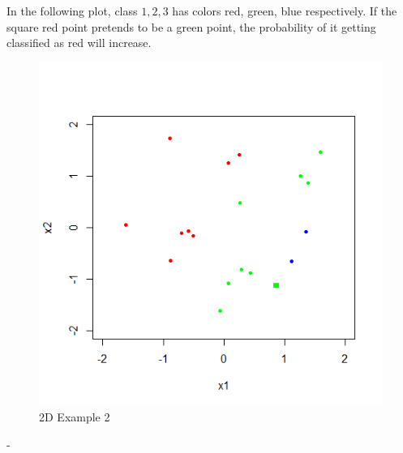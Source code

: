 \documentclass{article}
\begin{document}
In the following plot, class $1, 2, 3$ has colors red, green, blue respectively. If the square red point pretends to be a green point, the probability of it getting classified as red will increase.
\begin{figure}[H]
\centering
\includegraphics[width=0.5\linewidth]{test2d_1805}
\caption{2D Example 2}
\end{figure}
 -
\newline \newline


\end{document}
